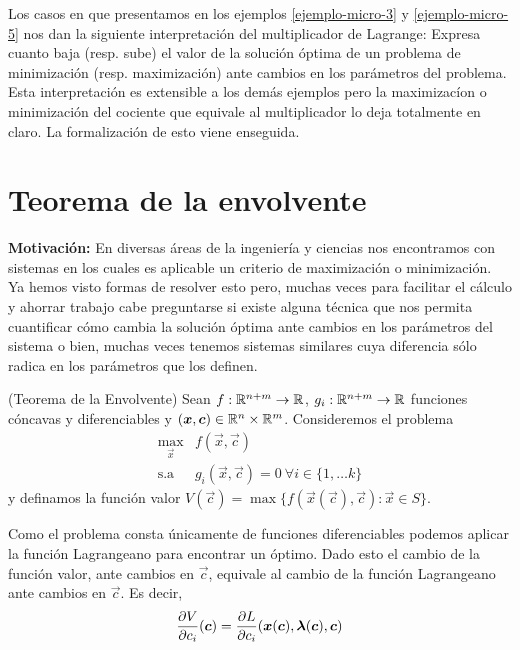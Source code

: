 \begin{nota}
Los casos en que presentamos en los ejemplos \ref{ejemplo-micro-3} y \ref{ejemplo-micro-5} nos dan la siguiente interpretaci\'on del multiplicador de Lagrange: Expresa cuanto baja (resp. sube) el valor de la soluci\'on \'optima de un problema de minimizaci\'on (resp. maximizaci\'on) ante cambios en los par\'ametros del problema. Esta interpretaci\'on es extensible a los dem\'as ejemplos pero la maximizac\'ion o minimizaci\'on del cociente que equivale al multiplicador lo deja totalmente en claro. La formalizaci\'on de esto viene enseguida.
\end{nota}

\section{Teorema de la envolvente}

\textbf{Motivaci\'on:} En diversas \'areas de la ingenier\'ia y ciencias nos encontramos con sistemas en los cuales es aplicable un criterio de maximizaci\'on o minimizaci\'on. Ya hemos visto formas de resolver esto pero, muchas veces para facilitar el c\'alculo y ahorrar trabajo cabe preguntarse si existe alguna t\'ecnica que nos permita cuantificar c\'omo cambia la soluci\'on \'optima ante cambios en los par\'ametros del sistema o bien, muchas veces tenemos sistemas similares cuya diferencia s\'olo radica en los par\'ametros que los definen.

\begin{teorema}{\rm (Teorema de la Envolvente)}
Sean $f: \mathbb{R}^{n+m} \rightarrow \mathbb{R}$, $g_i : \mathbb{R}^{n+m} \rightarrow \mathbb{R}$ funciones c\'oncavas y diferenciables y $(\boldsymbol{x},\boldsymbol{c})\in \mathbb{R}^n\times \mathbb{R}^m$. Consideremos el problema
\begin{equation*}
\begin{array}{cl}
\displaystyle \max_{\vec{x}} 		& f(\vec{x},\vec{c}) 	 \\
\text{s.a}					& g_i(\vec{x},\vec{c})=0 \:\forall i \in \{1,\ldots k\}
\end{array}
\end{equation*}
y definamos la funci\'on valor $V(\vec{c}) = \max \{ f(\vec{x}(\vec{c}),\vec{c}) : \vec{x}\in S\}$. %

Como el problema consta \'unicamente de funciones diferenciables podemos aplicar la funci\'on Lagrangeano para encontrar un \'optimo. Dado esto el cambio de la funci\'on valor, ante cambios en $\vec{c}$, equivale al cambio de la funci\'on Lagrangeano ante cambios en $\vec{c}$. Es decir,
\begin{equation*}
\frac{\partial V}{\partial c_i}(\boldsymbol{c}) = \frac{\partial L}{\partial c_i}(\boldsymbol{x}(\boldsymbol{c}),\boldsymbol{\lambda}(\boldsymbol{c}),\boldsymbol{c})
\end{equation*}
\end{teorema}

